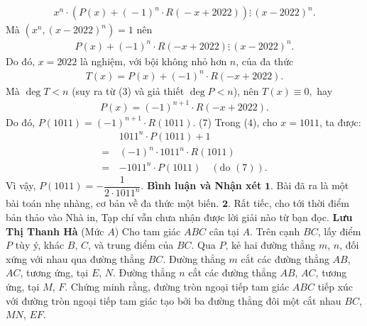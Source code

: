 \begin{multicols}{2}
	\begin{align*}
		{x^n} \!\cdot\! \left( {P\left( x \right) \!+\! {{\left( { \!-\! 1} \right)}^n} \!\cdot\! R\left( { \!-\! x \!+\! 2022} \right)} \!\right) \vdots\, {\left( {x \!-\! 2022} \right)^n}.
	\end{align*}
	Mà  $\left( {{x^n},{{\left( {x - 2022} \right)}^n}} \right) = 1$ nên
	\begin{align*}
		P\left( x \right) + {\left( { - 1} \right)^n} \cdot R\left( { - x + 2022} \right) \vdots\, {\left( {x - 2022} \right)^n}.
	\end{align*}
	Do đó, $x = 2022$ là nghiệm, với bội không nhỏ hơn $n$, của đa thức
	\begin{align*}
		T\left( x \right) = P\left( x \right) + {\left( { - 1} \right)^n} \cdot R\left( { - x + 2022} \right).
	\end{align*}
	Mà $\deg T < n$  (suy ra từ ($3$) và giả thiết  $\deg P < n$), nên $T\left( x \right) \equiv 0,$  hay
	\begin{align*}
		P\left( x \right) = {\left( { - 1} \right)^{n + 1}} \cdot R\left( { - x + 2022} \right).
	\end{align*}
	Do đó, $P\left( {1011} \right) = {\left( { - 1} \right)^{n + 1}} \cdot R\left( {1011} \right)$. \hfill ($7$)
	\vskip 0.05cm
	Trong ($4$), cho $x = 1011$, ta được:
	\begin{align*}
		&{1011^n} \cdot P\left( {1011} \right) + 1 \\
		= \,&{\left( { - 1} \right)^n} \cdot {1011^n} \cdot R\left( {1011} \right)\\ 
		=  &- {1011^n} \cdot P\left( {1011} \right) \quad\left(\text{do }(7) \right).
	\end{align*}
	Vì vậy, $P\left( {1011} \right) =  - \dfrac{1}{{2 \cdot {{1011}^n}}}$.
	\vskip 0.05cm  
	\textbf{\color{thachthuctoanhoc}Bình luận và Nhận xét}
	\vskip 0.05cm
	$\pmb{1.}$ Bài đã ra là một bài toán nhẹ nhàng, cơ bản về đa thức một biến.
	\vskip 0.05cm
	$\pmb{2.}$ Rất tiếc, cho tới thời điểm bản thảo vào Nhà in, Tạp chí vẫn chưa nhận được lời giải nào từ bạn đọc.
	\vskip 0.1cm
	\hfill\textbf{\color{thachthuctoanhoc}Lưu Thị Thanh Hà}
	\vskip 0.1cm
	{}
	(Mức $A$)
	Cho tam giác $ABC$ cân tại $A$. Trên cạnh $BC$, lấy điểm $P$ tùy ý, khác $B$, $C$, và trung điểm của $BC$. Qua $P$, kẻ hai đường thẳng $m$, $n$, đối xứng với nhau qua đường thẳng $BC$. Đường thẳng $m$ cắt các đường thẳng $AB$, $AC$, tương ứng, tại $E$, $N$. Đường thẳng $n$ cắt các đường thẳng $AB$, $AC$, tương ứng, tại $M$, $F$. Chứng minh rằng, đường tròn ngoại tiếp tam giác $ABC$ tiếp xúc với đường tròn ngoại tiếp tam giác tạo bởi ba đường thẳng đôi một cắt nhau $BC$, $MN$, $EF$.

\end{multicols}
